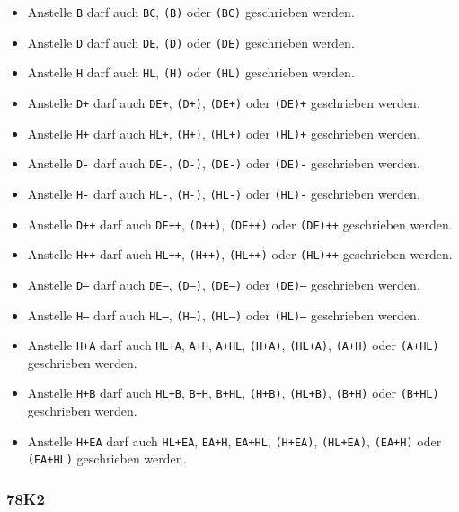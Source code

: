 \documentclass[12pt,a4paper,twoside]{report}
\newcommand{\tty}[1]{{\tt #1}}
\begin{document}
\begin{itemize}
\item{Anstelle \tty{B} darf auch \tty{BC}, \tty{(B)} oder
      \tty{(BC)} geschrieben werden.}
\item{Anstelle \tty{D} darf auch \tty{DE}, \tty{(D)} oder
      \tty{(DE)} geschrieben werden.}
\item{Anstelle \tty{H} darf auch \tty{HL}, \tty{(H)} oder
      \tty{(HL)} geschrieben werden.}
\item{Anstelle \tty{D+} darf auch \tty{DE+}, \tty{(D+)},
      \tty{(DE+)} oder \tty{(DE)+} geschrieben werden.}
\item{Anstelle \tty{H+} darf auch \tty{HL+}, \tty{(H+)},
      \tty{(HL+)} oder \tty{(HL)+} geschrieben werden.}
\item{Anstelle \tty{D-} darf auch \tty{DE-}, \tty{(D-)},
      \tty{(DE-)} oder \tty{(DE)-} geschrieben werden.}
\item{Anstelle \tty{H-} darf auch \tty{HL-}, \tty{(H-)},
      \tty{(HL-)} oder \tty{(HL)-} geschrieben werden.}
\item{Anstelle \tty{D++} darf auch \tty{DE++}, \tty{(D++)},
      \tty{(DE++)} oder \tty{(DE)++} geschrieben werden.}
\item{Anstelle \tty{H++} darf auch \tty{HL++}, \tty{(H++)},
      \tty{(HL++)} oder \tty{(HL)++} geschrieben werden.}
\item{Anstelle \tty{D--} darf auch \tty{DE--}, \tty{(D--)},
      \tty{(DE--)} oder \tty{(DE)--} geschrieben werden.}
\item{Anstelle \tty{H--} darf auch \tty{HL--}, \tty{(H--)},
      \tty{(HL--)} oder \tty{(HL)--} geschrieben werden.}
\item{Anstelle \tty{H+A} darf auch \tty{HL+A}, \tty{A+H},
      \tty{A+HL}, \tty{(H+A)}, \tty{(HL+A)}, \tty{(A+H)}
      oder \tty{(A+HL)} geschrieben werden.}
\item{Anstelle \tty{H+B} darf auch \tty{HL+B}, \tty{B+H},
      \tty{B+HL}, \tty{(H+B)}, \tty{(HL+B)}, \tty{(B+H)}
      oder \tty{(B+HL)} geschrieben werden.}
\item{Anstelle \tty{H+EA} darf auch \tty{HL+EA}, \tty{EA+H},
      \tty{EA+HL}, \tty{(H+EA)}, \tty{(HL+EA)}, \tty{(EA+H)}
      oder \tty{(EA+HL)} geschrieben werden.}
\end{itemize}


\subsubsection{78K2}
\end{document}
